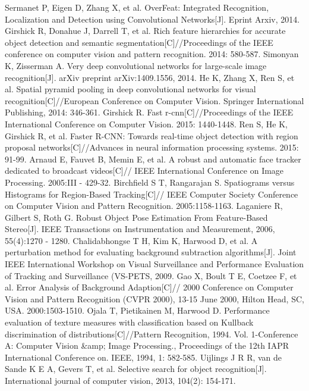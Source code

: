 \begin{thebibliography}{148}
Sermanet P, Eigen D, Zhang X, et al. OverFeat: Integrated Recognition, Localization and Detection using Convolutional Networks[J]. Eprint Arxiv, 2014.
Girshick R, Donahue J, Darrell T, et al. Rich feature hierarchies for accurate object detection and semantic segmentation[C]//Proceedings of the IEEE conference on computer vision and pattern recognition. 2014: 580-587.
Simonyan K, Zisserman A. Very deep convolutional networks for large-scale image recognition[J]. arXiv preprint arXiv:1409.1556, 2014.
He K, Zhang X, Ren S, et al. Spatial pyramid pooling in deep convolutional networks for visual recognition[C]//European Conference on Computer Vision. Springer International Publishing, 2014: 346-361.
Girshick R. Fast r-cnn[C]//Proceedings of the IEEE International Conference on Computer Vision. 2015: 1440-1448.
Ren S, He K, Girshick R, et al. Faster R-CNN: Towards real-time object detection with region proposal networks[C]//Advances in neural information processing systems. 2015: 91-99.
Arnaud E, Fauvet B, Memin E, et al. A robust and automatic face tracker dedicated to broadcast videos[C]// IEEE International Conference on Image Processing. 2005:III - 429-32.
Birchfield S T, Rangarajan S. Spatiograms versus Histograms for Region-Based Tracking[C]// IEEE Computer Society Conference on Computer Vision and Pattern Recognition. 2005:1158-1163.
Laganiere R, Gilbert S, Roth G. Robust Object Pose Estimation From Feature-Based Stereo[J]. IEEE Transactions on Instrumentation and Measurement, 2006, 55(4):1270 - 1280.
Chalidabhongse T H, Kim K, Harwood D, et al. A perturbation method for evaluating background subtraction algorithms[J]. Joint IEEE International Workshop on Visual Surveillance and Performance Evaluation of Tracking and Surveillance (VS-PETS, 2009.
Gao X, Boult T E, Coetzee F, et al. Error Analysis of Background Adaption[C]// 2000 Conference on Computer Vision and Pattern Recognition (CVPR 2000), 13-15 June 2000, Hilton Head, SC, USA. 2000:1503-1510.
Ojala T, Pietikainen M, Harwood D. Performance evaluation of texture measures with classification based on Kullback discrimination of distributions[C]//Pattern Recognition, 1994. Vol. 1-Conference A: Computer Vision \&amp; Image Processing., Proceedings of the 12th IAPR International Conference on. IEEE, 1994, 1: 582-585.
Uijlings J R R, van de Sande K E A, Gevers T, et al. Selective search for object recognition[J]. International journal of computer vision, 2013, 104(2): 154-171.

\end{thebibliography}
